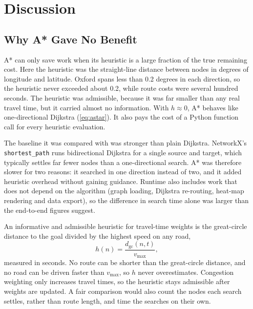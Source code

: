 \documentclass[12pt]{report}
\newcommand{\code}[1]{\texttt{#1}}
\begin{document}

\chapter{Discussion}
\label{ch:discussion}

\section{Why A* Gave No Benefit}
\label{sec:disc-astar}

A* can only save work when its heuristic is a large fraction of the true remaining cost. Here the heuristic was the straight-line distance between nodes in degrees of longitude and latitude. Oxford spans less than 0.2 degrees in each direction, so the heuristic never exceeded about 0.2, while route costs were several hundred seconds. The heuristic was admissible, because it was far smaller than any real travel time, but it carried almost no information. With $h \approx 0$, A* behaves like one-directional Dijkstra (\cref{eq:astar}). It also pays the cost of a Python function call for every heuristic evaluation.

The baseline it was compared with was stronger than plain Dijkstra. NetworkX's \code{shortest\_path} runs bidirectional Dijkstra for a single source and target, which typically settles far fewer nodes than a one-directional search. A* was therefore slower for two reasons: it searched in one direction instead of two, and it added heuristic overhead without gaining guidance. Runtime also includes work that does not depend on the algorithm (graph loading, Dijkstra re-routing, heat-map rendering and data export), so the difference in search time alone was larger than the end-to-end figures suggest.

An informative and admissible heuristic for travel-time weights is the great-circle distance to the goal divided by the highest speed on any road,
\begin{equation}
h(n) = \frac{d_{\text{gc}}(n, t)}{v_{\max}},
\label{eq:betterh}
\end{equation}
measured in seconds. No route can be shorter than the great-circle distance, and no road can be driven faster than $v_{\max}$, so $h$ never overestimates. Congestion weighting only increases travel times, so the heuristic stays admissible after weights are updated. A fair comparison would also count the nodes each search settles, rather than route length, and time the searches on their own.
\end{document}

